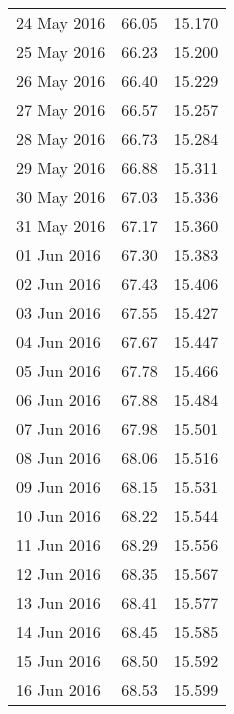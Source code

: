 \documentclass[11pt,a4paper,twoside]{article}
\begin{document}
\begin{longtable}{lcc}
24 May 2016                    & 66.05                & 15.170     \\
25 May 2016                    & 66.23                & 15.200     \\
26 May 2016                    & 66.40                & 15.229     \\
27 May 2016                    & 66.57                & 15.257     \\
28 May 2016                    & 66.73                & 15.284     \\
29 May 2016                    & 66.88                & 15.311     \\
30 May 2016                    & 67.03                & 15.336     \\
31 May 2016                    & 67.17                & 15.360     \\
01 Jun 2016                    & 67.30                & 15.383     \\
02 Jun 2016                    & 67.43                & 15.406     \\
03 Jun 2016                    & 67.55                & 15.427     \\
04 Jun 2016                    & 67.67                & 15.447     \\
05 Jun 2016                    & 67.78                & 15.466     \\
06 Jun 2016                    & 67.88                & 15.484     \\
07 Jun 2016                    & 67.98                & 15.501     \\
08 Jun 2016                    & 68.06                & 15.516     \\
09 Jun 2016                    & 68.15                & 15.531     \\
10 Jun 2016                    & 68.22                & 15.544     \\
11 Jun 2016                    & 68.29                & 15.556     \\
12 Jun 2016                    & 68.35                & 15.567     \\
13 Jun 2016                    & 68.41                & 15.577     \\
14 Jun 2016                    & 68.45                & 15.585     \\
15 Jun 2016                    & 68.50                & 15.592     \\
16 Jun 2016                    & 68.53                & 15.599     \\

\end{longtable}
\end{document}
